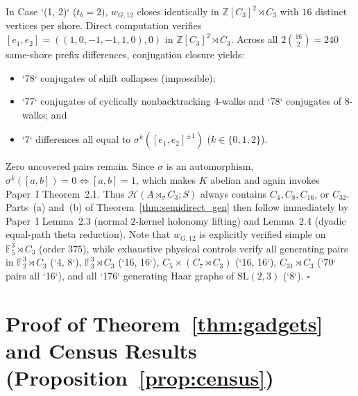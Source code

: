\documentclass[11pt]{amsart}
\theoremstyle{definition}
\theoremstyle{remark}
\newcommand{\F}{\mathbb{F}}
\newcommand{\Z}{\mathbb{Z}}
\newcommand{\Haar}{\mathcal{H}}
\begin{document}
In Case `(1, 2)` ($t_b = 2$), $w_{G,12}$ closes identically in $\Z[C_3]^2 \rtimes C_3$ with $16$ distinct vertices per shore. Direct computation verifies $[e_1, e_2] = ((1, 0, -1, -1, 1, 0), 0)$ in $\Z[C_3]^2 \rtimes C_3$. Across all $2\binom{16}{2} = 240$ same-shore prefix differences, conjugation closure yields:
\begin{itemize}
\item `78` conjugates of shift collapses (impossible);
\item `77` conjugates of cyclically nonbacktracking $4$-walks and `78` conjugates of $8$-walks; and
\item `7` differences all equal to $\sigma^k([e_1, e_2]^{\pm 1})$ ($k \in \{0,1,2\}$).
\end{itemize}
Zero uncovered pairs remain. Since $\sigma$ is an automorphism, $\sigma^k([a,b]) = 0 \iff [a,b] = 1$, which makes $K$ abelian and again invokes Paper~I Theorem~2.1. Thus $\Haar(A \rtimes_\sigma C_3; S)$ always contains $C_4, C_8, C_{16}$, or $C_{32}$. Parts~(a) and~(b) of Theorem~\ref{thm:semidirect_gen} then follow immediately by Paper~I Lemma~2.3 (normal $2$-kernel holonomy lifting) and Lemma~2.4 (dyadic equal-path theta reduction). Note that $w_{G,12}$ is explicitly verified simple on $\F_5^3 \rtimes C_3$ (order $375$), while exhaustive physical controls verify all generating pairs in $\F_2^3 \rtimes C_3$ (`4, 8`), $\F_3^3 \rtimes C_3$ (`16, 16`), $C_5 \times (C_7 \rtimes C_3)$ (`16, 16`), $C_{31} \rtimes C_3$ (`70` pairs all `16`), and all `176` generating Haar graphs of $\mathrm{SL}(2,3)$ (`8`). $\square$

\section{Proof of Theorem~\ref{thm:gadgets} and Census Results (Proposition~\ref{prop:census})}\label{sec:gadgets}
\end{document}

